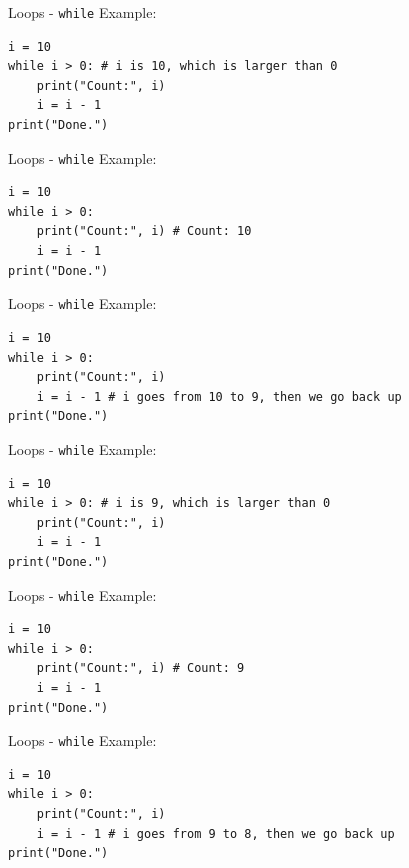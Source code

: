 \documentclass[dvipsnames, svgnames, x11names, handout]{beamer}
\begin{document}
\addtocounter{framenumber}{-1}

\begin{frame}[fragile]{Loops - \texttt{while}}
Example:
\begin{verbatim}
i = 10
while i > 0: # i is 10, which is larger than 0
    print("Count:", i)
    i = i - 1
print("Done.")
\end{verbatim}
\end{frame}

\addtocounter{framenumber}{-1}

\begin{frame}[fragile]{Loops - \texttt{while}}
Example:
\begin{verbatim}
i = 10
while i > 0: 
    print("Count:", i) # Count: 10
    i = i - 1
print("Done.")
\end{verbatim}
\end{frame}

\addtocounter{framenumber}{-1}

\begin{frame}[fragile]{Loops - \texttt{while}}
Example:
\begin{verbatim}
i = 10
while i > 0: 
    print("Count:", i)
    i = i - 1 # i goes from 10 to 9, then we go back up
print("Done.")
\end{verbatim}
\end{frame}

\addtocounter{framenumber}{-1}

\begin{frame}[fragile]{Loops - \texttt{while}}
Example:
\begin{verbatim}
i = 10
while i > 0: # i is 9, which is larger than 0
    print("Count:", i)
    i = i - 1
print("Done.")
\end{verbatim}
\end{frame}

\addtocounter{framenumber}{-1}

\begin{frame}[fragile]{Loops - \texttt{while}}
Example:
\begin{verbatim}
i = 10
while i > 0: 
    print("Count:", i) # Count: 9
    i = i - 1
print("Done.")
\end{verbatim}
\end{frame}

\addtocounter{framenumber}{-1}

\begin{frame}[fragile]{Loops - \texttt{while}}
Example:
\begin{verbatim}
i = 10
while i > 0: 
    print("Count:", i)
    i = i - 1 # i goes from 9 to 8, then we go back up
print("Done.")
\end{verbatim}
\end{frame}
\end{document}
